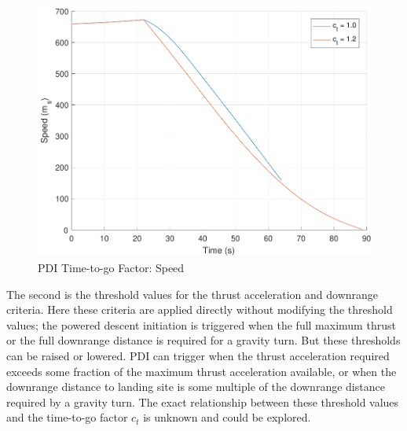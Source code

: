 \begin{figure}[H]
	\centering
	\begin{minipage}{4.5 in}
		\includegraphics[width=\linewidth]{Figures/spdtgofac.pdf}
		\caption{PDI Time-to-go Factor: Speed \label{fig:spdtgofac} }
	\end{minipage}
\end{figure}



The second is the threshold values for the thrust acceleration and downrange criteria. Here these criteria are applied directly without modifying the threshold values; the powered descent initiation is triggered when the full maximum thrust or the full downrange distance is required for a gravity turn. But these thresholds can be raised or lowered. PDI can trigger when the thrust acceleration required exceeds some fraction of the maximum thrust acceleration available, or when the downrange distance to landing site is some multiple of the downrange distance required by a gravity turn. The exact relationship between these threshold values and the time-to-go factor $c_t$ is unknown and could be explored. 

